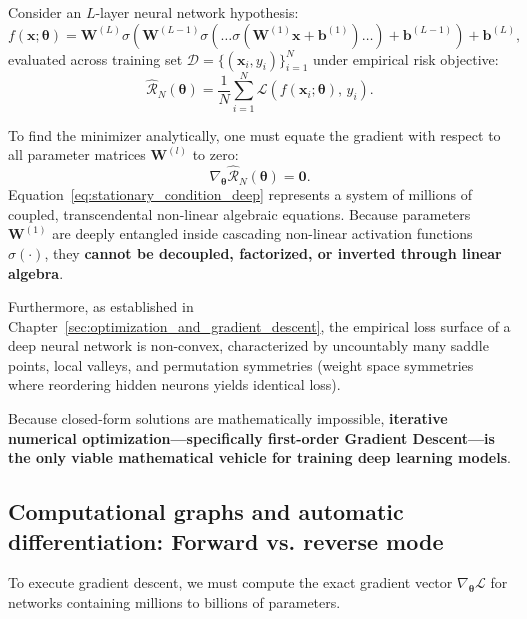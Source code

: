 Consider an $L$-layer neural network hypothesis:
\begin{equation}
f(\mathbf{x}; \boldsymbol{\theta}) = \mathbf{W}^{(L)} \sigma\left( \mathbf{W}^{(L-1)} \sigma\left( \dots \sigma\left( \mathbf{W}^{(1)} \mathbf{x} + \mathbf{b}^{(1)} \right) \dots \right) + \mathbf{b}^{(L-1)} \right) + \mathbf{b}^{(L)},
\label{eq:deep_composition_hypothesis}
\end{equation}
evaluated across training set $\mathcal{D} = \{(\mathbf{x}_i, y_i)\}_{i=1}^N$ under empirical risk objective:
\begin{equation}
\hat{\mathcal{R}}_N(\boldsymbol{\theta}) = \frac{1}{N} \sum_{i=1}^N \mathcal{L}\left( f(\mathbf{x}_i; \boldsymbol{\theta}), \, y_i \right).
\end{equation}

To find the minimizer analytically, one must equate the gradient with respect to all parameter matrices $\mathbf{W}^{(l)}$ to zero:
\begin{equation}
\nabla_{\boldsymbol{\theta}} \hat{\mathcal{R}}_N(\boldsymbol{\theta}) = \mathbf{0}.
\label{eq:stationary_condition_deep}
\end{equation}
Equation~\eqref{eq:stationary_condition_deep} represents a system of millions of coupled, transcendental non-linear algebraic equations. Because parameters $\mathbf{W}^{(1)}$ are deeply entangled inside cascading non-linear activation functions $\sigma(\cdot)$, they \textbf{cannot be decoupled, factorized, or inverted through linear algebra}.

Furthermore, as established in Chapter~\ref{sec:optimization_and_gradient_descent}, the empirical loss surface of a deep neural network is non-convex, characterized by uncountably many saddle points, local valleys, and permutation symmetries (weight space symmetries where reordering hidden neurons yields identical loss).

Because closed-form solutions are mathematically impossible, \textbf{iterative numerical optimization—specifically first-order Gradient Descent—is the only viable mathematical vehicle for training deep learning models}.

\subsection{Computational graphs and automatic differentiation: Forward vs. reverse mode}
\label{sec:computational_graphs_autodiff}

To execute gradient descent, we must compute the exact gradient vector $\nabla_{\boldsymbol{\theta}} \mathcal{L}$ for networks containing millions to billions of parameters. 


